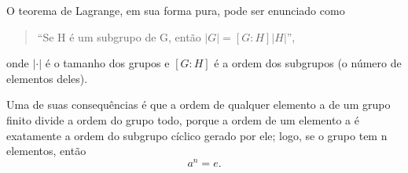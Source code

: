 \documentclass[../algebraIII_notes.tex]{subfiles}
\begin{document}
\begin{tcolorbox}[
		skin=enhanced,
		title=Lembrete!,
		after title={\hfill Teorema de Lagrange},
		fonttitle=\bfseries,
		sharp corners=downhill,
		colframe=black,
		colbacktitle=yellow!75!white,
		colback=yellow!30,
		colbacklower=black,
		coltitle=black,
		drop large lifted shadow
	]
	O \hypertarget{lagrange_theorem}{teorema de Lagrange}, em sua forma pura, pode ser enunciado como
	\begin{quote}
		``Se H é um subgrupo de G, então \(| G | = [G:H] | H |\)'',
	\end{quote}
	onde \(| \cdot  | \) é o tamanho dos grupos e \([G:H]\) é a ordem dos subgrupos (o número de elementos deles).

	Uma de suas consequências é que a ordem de qualquer elemento a de um grupo finito divide a ordem do grupo todo, porque a ordem de um elemento a é exatamente a ordem do subgrupo cíclico gerado por ele; logo, se o grupo tem n elementos, então
	\[
		a^{n}=e.
	\]
\end{tcolorbox}
\end{document}
